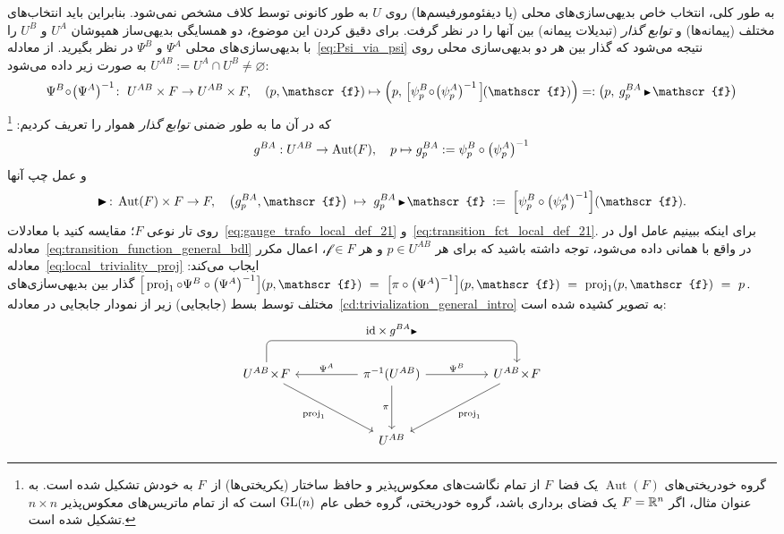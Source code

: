 به طور کلی، انتخاب خاص بدیهی‌سازی‌های محلی (یا دیفئومورفیسم‌ها) روی $U$ به طور کانونی توسط کلاف مشخص نمی‌شود.
بنابراین باید انتخاب‌های مختلف (پیمانه‌ها) و \emph{توابع گذار} (تبدیلات پیمانه) بین آنها را در نظر گرفت.
برای دقیق کردن این موضوع، دو همسایگی بدیهی‌ساز همپوشان $U^A$ و $U^B$ را با بدیهی‌سازی‌های محلی $\Psi^A$ و $\Psi^B$ در نظر بگیرید.
از معادله~\eqref{eq:Psi_via_psi} نتیجه می‌شود که گذار بین هر دو بدیهی‌سازی محلی روی $U^{AB}:=U^A\cap U^B\neq\varnothing$ به صورت زیر داده می‌شود:
\begin{align}\label{eq:transition_function_general_bdl}
	\Psi^B\!\circ\!\big(\Psi^A\big)^{-1}\!:\ U^{AB}\times F \to U^{AB}\times F,
	\quad (p,\mathscr{f}) \mapsto \left(p,\, \pig[\psi_p^B \!\circ\! \big(\psi_p^A\big)^{-1}\, \pig]\mkern-1.5mu(\mathscr{f}) \right)
	=: \left(p,\: g_p^{BA} \,\btr\mkern1.5mu \mathscr{f}\right)
\end{align}
که در آن ما به طور ضمنی \emph{توابع گذار} هموار را تعریف کردیم:%
\footnote{
	گروه خودریختی‌های $\operatorname{Aut}(F)$ یک فضا~$F$ از تمام نگاشت‌های معکوس‌پذیر و حافظ ساختار (یکریختی‌ها) از~$F$ به خودش تشکیل شده است.
	به عنوان مثال، اگر $F=\mathbb{R}^n$ یک فضای برداری باشد، گروه خودریختی، گروه خطی عام $\operatorname{GL}(n)$ است که از تمام ماتریس‌های معکوس‌پذیر $n\!\times\!n$ تشکیل شده است.
}
\begin{align}\label{eq:transition_functions_psi}
	g^{BA}: U^{AB} \to \operatorname{Aut}(F),\ \ \ p \mapsto g_p^{BA} := \psi_p^B \circ \big(\psi_p^A\big)^{-1}
\end{align}
و عمل چپ آنها
\begin{align}\label{eq:gauge_trafo_leftaction}
	\blacktriangleright\,:\, \Aut(F) \times F\to F, \quad
	\left(g_p^{BA}, \mathscr{f}\right) \;\mapsto\; g_p^{BA}\,\btr\mkern1.5mu \mathscr{f} \;:=\; \left[\psi_p^B\circ\big(\psi_p^A\big)^{-1}\right]\!(\mathscr{f}).
\end{align}
روی تار نوعی $F$؛ مقایسه کنید با معادلات~\eqref{eq:gauge_trafo_local_def_21} و~\eqref{eq:transition_fct_local_def_21}.
برای اینکه ببینیم عامل اول در معادله~\eqref{eq:transition_function_general_bdl} در واقع با همانی داده می‌شود، توجه داشته باشید که برای هر $p\in U^{AB}$ و هر $\mathscr{f}\in F$، اعمال مکرر معادله~\eqref{eq:local_triviality_proj} ایجاب می‌کند:
$
	\pig[ \proj_1 \circ \Psi^B \circ \big(\Psi^A\big)^{-1} \mkern1mu\pig] (p,\mathscr{f})
	\ =\ \pig[ \pi \circ \big(\Psi^A\big)^{-1}  \mkern1mu\pig] (p,\mathscr{f})
	\ =\ \proj_1 (p,\mathscr{f})
	\ =\ p \,.
$
گذار بین بدیهی‌سازی‌های مختلف توسط بسط (جابجایی) زیر از نمودار جابجایی در معادله~\eqref{cd:trivialization_general_intro} به تصویر کشیده شده است:
\begin{equation}\label{cd:trivialization_general_trafo}
\begin{tikzcd}[row sep=3.5em, column sep=5.em]
	U^{AB}\!\times\!F
		\arrow[rd, "\proj_1"']
		\arrow[rr, rounded corners, to path={ 
				-- ([yshift=4ex]\tikztostart.north) 
				--node[above, pos=.5]{\small$\id \times g^{BA}\btr$} ([yshift=4ex]\tikztotarget.north) 
				-- (\tikztotarget.north)
				}]
	& \pi^{-1}(U^{AB})
		\arrow[d, swap, "\pi"]
		\arrow[l, "\Psi^A"']
		\arrow[r, "\Psi^B"]
	& U^{AB}\!\times\!F
		\arrow[ld, "\proj_1"]
	\\
	& U^{AB}
\end{tikzcd}
\end{equation}
